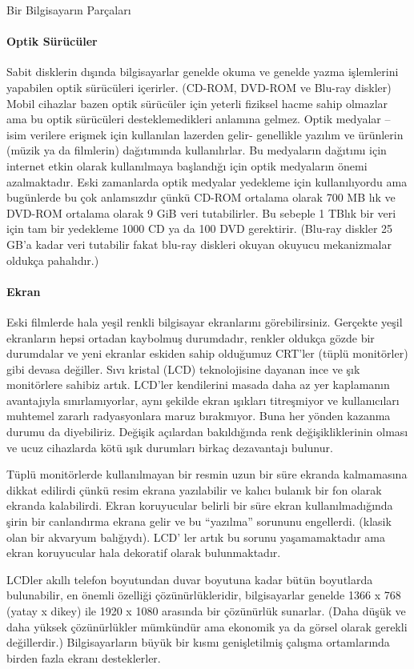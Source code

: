 \begin{section}{Bir Bilgisayarın Parçaları}
\paragraph{Optik Sürücüler}{Sabit disklerin dışında bilgisayarlar genelde okuma ve genelde yazma işlemlerini yapabilen optik sürücüleri içerirler. (CD-ROM, DVD-ROM ve Blu-ray diskler) Mobil cihazlar bazen optik sürücüler için yeterli fiziksel hacme sahip olmazlar ama bu optik sürücüleri desteklemedikleri anlamına gelmez. Optik medyalar – isim verilere erişmek için kullanılan lazerden gelir- genellikle yazılım ve ürünlerin (müzik ya da filmlerin) dağıtımında kullanılırlar. Bu medyaların dağıtımı için internet etkin olarak kullanılmaya başlandığı için optik medyaların önemi azalmaktadır.}
Eski zamanlarda optik medyalar yedekleme için kullanılıyordu ama bugünlerde bu çok anlamsızdır çünkü CD-ROM ortalama olarak 700 MB lık ve DVD-ROM ortalama olarak 9 GiB veri tutabilirler. Bu sebeple 1 TBlık bir veri için tam bir yedekleme 1000 CD ya da 100 DVD gerektirir. (Blu-ray diskler 25 GB'a kadar veri tutabilir fakat blu-ray diskleri okuyan okuyucu mekanizmalar oldukça pahalıdır.)
\paragraph{Ekran}{Eski filmlerde hala yeşil renkli bilgisayar ekranlarını görebilirsiniz. Gerçekte yeşil ekranların hepsi ortadan kaybolmuş durumdadır, renkler oldukça gözde bir durumdalar ve yeni ekranlar eskiden sahip olduğumuz CRT'ler (tüplü monitörler) gibi devasa değiller. Sıvı kristal (LCD) teknolojisine dayanan ince ve şık monitörlere sahibiz artık. LCD'ler kendilerini masada daha az yer kaplamanın avantajıyla sınırlamıyorlar, aynı şekilde ekran ışıkları titreşmiyor ve kullanıcıları muhtemel zararlı radyasyonlara maruz bırakmıyor. Buna her yönden kazanma durumu da diyebiliriz.  Değişik açılardan bakıldığında renk değişikliklerinin olması ve ucuz cihazlarda kötü ışık durumları birkaç dezavantajı bulunur.}

Tüplü monitörlerde kullanılmayan bir resmin uzun bir süre ekranda kalmamasına dikkat edilirdi çünkü resim ekrana yazılabilir ve kalıcı bulanık bir fon olarak ekranda kalabilirdi. Ekran koruyucular belirli bir süre ekran kullanılmadığında şirin bir canlandırma ekrana gelir ve bu “yazılma” sorununu engellerdi. (klasik olan bir akvaryum balığıydı). LCD' ler artık bu sorunu yaşamamaktadır ama ekran koruyucular hala dekoratif olarak bulunmaktadır.

LCDler akıllı telefon boyutundan duvar boyutuna kadar bütün boyutlarda bulunabilir, en önemli özelliği çözünürlükleridir, bilgisayarlar genelde 1366 x 768 (yatay x dikey) ile 1920 x 1080 arasında bir çözünürlük sunarlar. (Daha düşük ve daha yüksek çözünürlükler mümkündür ama ekonomik ya da görsel olarak gerekli değillerdir.) Bilgisayarların büyük bir kısmı genişletilmiş çalışma ortamlarında birden fazla ekranı desteklerler.


\end{section}
